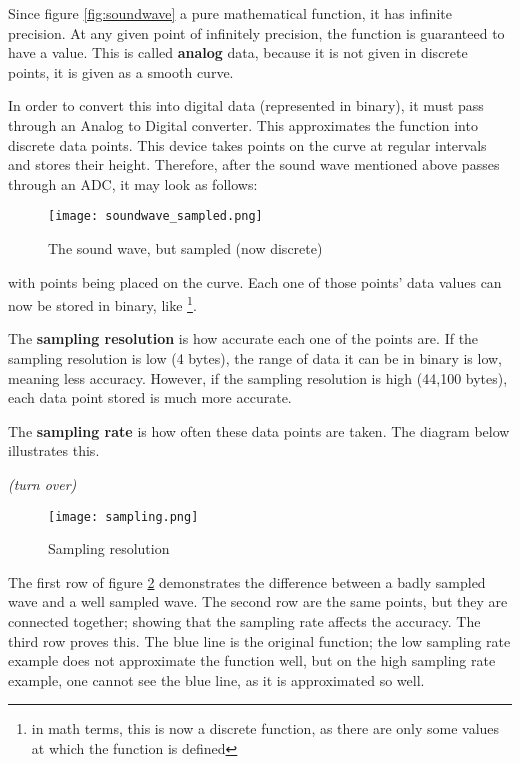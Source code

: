 \documentclass[../main.tex]{subfiles}
\begin{document}
Since figure \ref{fig:soundwave} a pure mathematical function, it has infinite precision. At any given point of infinitely precision, the function is guaranteed to have a value. This is called \textbf{analog} data, because it is not given in discrete points, it is given as a smooth curve.

In order to convert this into digital data (represented in binary), it must pass through an Analog to Digital converter. This approximates the function into discrete data points. This device takes points on the curve at regular intervals and stores their height. Therefore, after the sound wave mentioned above passes through an ADC, it may look as follows:

\vfill

\begin{figure}[H]
    \centering
    \texttt{[image: soundwave\_sampled.png]}
    \caption{The sound wave, but sampled (now discrete)}
    \label{fig:soundwave_sampled}
\end{figure}

with points being placed on the curve. Each one of those points' data values can now be stored in binary, like {}\footnote{in math terms, this is now a discrete function, as there are only some values at which the function is defined}. 

The \textbf{sampling resolution} is how accurate each one of the points are. If the sampling resolution is low (4 bytes), the range of data it can be in binary is low, meaning less accuracy. However, if the sampling resolution is high (44,100 bytes), each data point stored is much more accurate.

The \textbf{sampling rate} is how often these data points are taken. The diagram below illustrates this.

\vfill

\textit{(turn over)}

\begin{figure}[H]
    \centering
    \texttt{[image: sampling.png]}
    \caption{Sampling resolution}
    \label{fig:sampling}
\end{figure}

The first row of figure \ref{fig:sampling} demonstrates the difference between a badly sampled wave and a well sampled wave. The second row are the same points, but they are connected together; showing that the sampling rate affects the accuracy. The third row proves this. The blue line is the original function; the low sampling rate example does not approximate the function well, but on the high sampling rate example, one cannot see the blue line, as it is approximated so well.
\end{document}
